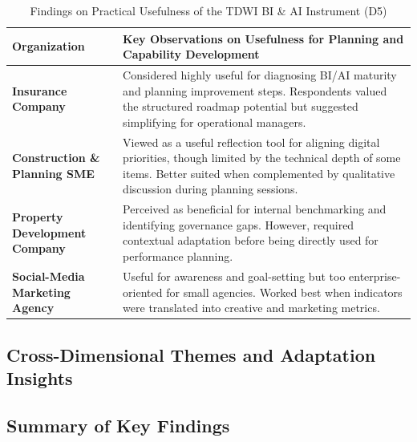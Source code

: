 \documentclass[conference]{IEEEtran}
\begin{document}
\begin{table}[h!]
\centering
\caption{Findings on Practical Usefulness of the TDWI BI \& AI Instrument (D5)}
\label{tab:d5_usefulness}
\renewcommand{\arraystretch}{1.2}
\begin{tabular}{p{.16\linewidth} p{.74\linewidth}}
\hline
\textbf{Organization} & \textbf{Key Observations on Usefulness for Planning and Capability Development} \\ \hline

\textbf{Insurance Company} & 
Considered highly useful for diagnosing BI/AI maturity and planning improvement steps.  
Respondents valued the structured roadmap potential but suggested simplifying for operational managers. \\ \hline

\textbf{Construction \& Planning SME} & 
Viewed as a useful reflection tool for aligning digital priorities, though limited by the technical depth of some items.  
Better suited when complemented by qualitative discussion during planning sessions. \\ \hline

\textbf{Property Development Company} & 
Perceived as beneficial for internal benchmarking and identifying governance gaps.  
However, required contextual adaptation before being directly used for performance planning. \\ \hline

\textbf{Social-Media Marketing Agency} & 
Useful for awareness and goal-setting but too enterprise-oriented for small agencies.  
Worked best when indicators were translated into creative and marketing metrics. \\ \hline
\end{tabular}
\end{table}


\subsection{Cross-Dimensional Themes and Adaptation Insights}

\subsection{Summary of Key Findings}
\end{document}
